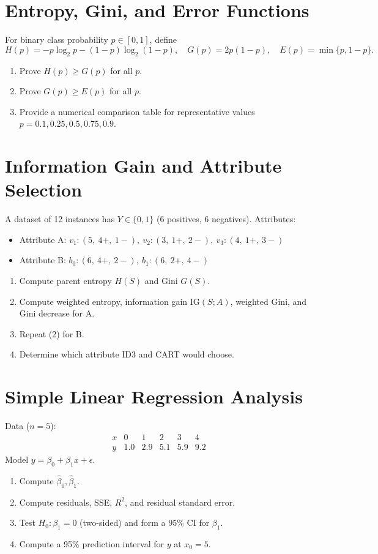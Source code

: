 \documentclass[12pt,a4paper]{article}
\begin{document}
\section{Entropy, Gini, and Error Functions}
For binary class probability \( p \in [0,1] \), define
\[
H(p) = -p \log_2 p - (1-p)\log_2(1-p), \quad
G(p) = 2p(1-p), \quad
E(p) = \min\{p, 1-p\}.
\]
\begin{enumerate}[label=(\alph*)]
\item Prove \( H(p) \geq G(p) \) for all \( p \).
\item Prove \( G(p) \geq E(p) \) for all \( p \).
\item Provide a numerical comparison table for representative values \( p = 0.1, 0.25, 0.5, 0.75, 0.9 \).
\end{enumerate}

\section{Information Gain and Attribute Selection}
A dataset of 12 instances has \( Y \in \{0,1\} \) (6 positives, 6 negatives).
Attributes:

\begin{itemize}
    \item Attribute A: \( v_1:(5,\ 4+,\ 1-),\ v_2:(3,\ 1+,\ 2-),\ v_3:(4,\ 1+,\ 3-) \)
    \item Attribute B: \( b_0:(6,\ 4+,\ 2-),\ b_1:(6,\ 2+,\ 4-) \)
\end{itemize}
\begin{enumerate}[label=(\arabic*)]
\item Compute parent entropy \(H(S)\) and Gini \(G(S)\).
\item Compute weighted entropy, information gain \(\mathrm{IG}(S;A)\), weighted Gini, and Gini decrease for A.
\item Repeat (2) for B.
\item Determine which attribute ID3 and CART would choose.
\end{enumerate}

\section{Simple Linear Regression Analysis}
Data (\( n=5 \)):
\[
\begin{array}{c|ccccc}
x & 0 & 1 & 2 & 3 & 4 \\
\hline
y & 1.0 & 2.9 & 5.1 & 5.9 & 9.2
\end{array}
\]
Model \( y = \beta_0 + \beta_1 x + \epsilon \).
\begin{enumerate}[label=(\arabic*)]
\item Compute \( \hat{\beta}_0, \hat{\beta}_1 \).
\item Compute residuals, SSE, \( R^2 \), and residual standard error.
\item Test \( H_0:\beta_1=0 \) (two-sided) and form a 95\% CI for \( \beta_1 \).
\item Compute a 95\% prediction interval for \( y \) at \( x_0=5 \).
\end{enumerate}
\end{document}
